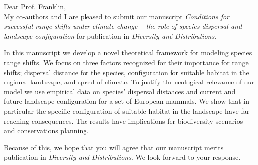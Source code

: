 \documentclass[11pt,stdletter,letterpaper]{newlfm}
\newcommand{\mytitle}{\emph{Conditions for successful range shifts under climate change -- the role of species dispersal and landscape configuration }}
\newcommand{\myjournal}{\emph{Diversity and Distributions}}
\begin{document}
\begin{newlfm}
Dear Prof. Franklin,\\

My co-authors and I are pleased to submit our manuscript \mytitle for publication in \myjournal. 

In this manuscript we develop a novel theoretical framework for modeling species range shifts. We focus on three factors recognized for their importance for range shifts; dispersal distance for the species, configuration for suitable habitat in the regional landscape, and speed of climate. To justify the ecological relevance of our model we use empirical data on species' dispersal distances and current and future landscape configuration for a set of European mammals. We show that in particular the specific configuration of suitable habitat in the landscape have far reaching consequences. The results have implications for biodiversity scenarios and conservations planning. 

Because of this, we hope that you will agree that our manuscript merits publication in \myjournal. We look forward to your response.



\end{newlfm}
\end{document}
